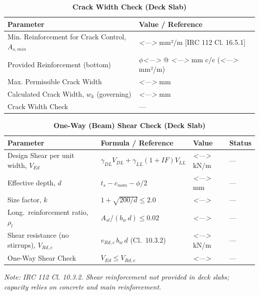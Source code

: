 \documentclass[12pt,a4paper]{report}
\numberwithin{table}{chapter}
\numberwithin{figure}{chapter}
\newcommand{\placeholder}[1]{\textit{\textless #1\textgreater}}
\begin{document}
\vspace{1em}
\clearpage
\begin{longtable}{|L{7cm}|>{\arraybackslash}p{8.5cm}|}
\caption{\textbf{Crack Width Check (Deck Slab)}}
\hline
\textbf{Parameter} & \textbf{Value / Reference} \\[6pt]
\hline
\textnormal{Min. Reinforcement for Crack Control, $A_{s,min}$} & \placeholder{---} mm²/m [IRC 112 Cl. 16.5.1] \\[6pt]
\hline
\textnormal{Provided Reinforcement (bottom)} & $\phi$\placeholder{---} @ \placeholder{---} mm c/c (\placeholder{---} mm²/m) \\[6pt]
\hline
\textnormal{Max. Permissible Crack Width} & \placeholder{---} mm \\[6pt]
\hline
\textnormal{Calculated Crack Width, $w_k$ (governing)} & \placeholder{---} mm \\[6pt]
\hline
\textnormal{Crack Width Check} & --- \\[6pt]
\hline
\end{longtable}

\vspace{1em}
\begin{longtable}{|L{5.5cm}|C{3.5cm}|>{\centering\arraybackslash}p{4.5cm}|C{2cm}|}
\caption{\textbf{One-Way (Beam) Shear Check (Deck Slab)}}
\hline
\textbf{Parameter} & \textbf{Formula / Reference} & \textbf{Value} & \textbf{Status} \\[6pt]
\hline
Design Shear per unit width, $V_{Ed}$ & $\gamma_{DL} V_{DL} + \gamma_{LL}(1{+}IF)V_{LL}$ & \placeholder{---} kN/m & --- \\[6pt]
\hline
Effective depth, $d$ & $t_s - c_{nom} - \phi/2$ & \placeholder{---} mm & --- \\[6pt]
\hline
Size factor, $k$ & $1 + \sqrt{200/d} \leq 2.0$ & \placeholder{---} & --- \\[6pt]
\hline
Long.\ reinforcement ratio, $\rho_l$ & $A_{sl}/(b_w\,d) \leq 0.02$ & \placeholder{---} & --- \\[6pt]
\hline
Shear resistance (no stirrups), $V_{Rd,c}$ & $v_{Rd,c}\,b_w\,d$ (Cl.\ 10.3.2) & \placeholder{---} kN/m & --- \\[6pt]
\hline
One-Way Shear Check & $V_{Ed} \leq V_{Rd,c}$ & \placeholder{---} & --- \\[6pt]
\hline
\end{longtable}
\noindent\textit{Note: IRC 112 Cl. 10.3.2. Shear reinforcement not provided in deck slabs; capacity relies on concrete and main reinforcement.}
\end{document}
